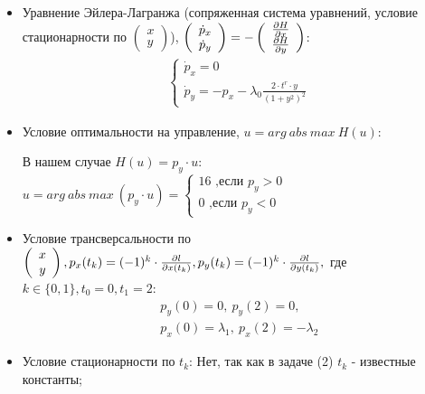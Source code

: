 \documentclass[a4paper,12pt]{article}
\newcommand{\partdef}[2]{\frac{\partial \mathnormal{#1}}{\partial \mathnormal{#2}}}
\begin{document}
\begin{itemize}
    \item[\text{(a)}]

    Уравнение Эйлера-Лагранжа (сопряженная система уравнений, условие стационарности по 
    $
    \left( 
        \begin{array}{c}
            x \\
            y
        \end{array}
    \right)
    $),
    $
    \left( 
        \begin{array}{c}
            \dot p_x \\
            \dot p_y
        \end{array}
    \right)=-
    \left( 
        \begin{array}{c}
            \partdef{H}{x} \\
            \partdef{H}{y}
        \end{array}
    \right)
    $:
    \begin{align}
    \left\{
    \begin{array}{l}
        \dot p_x = 0\\
        \dot p_y = -p_x - \lambda_0 \frac{2\cdot t^r \cdot y}{{(1+y^2)}^2}
    \end{array}
    \right.
    \end{align}

\item[\text{(б)}]
Условие оптимальности на управление, $u=arg \:abs\: max\: H(u)$:

В нашем случае $H(u)=p_y \cdot u$:
$u=arg \:abs\: max\:(p_y \cdot u )
=
\left\{
\begin{array}{l}
16 \text{ ,если } p_y>0 \\
0 \text{ ,если } p_y<0
\end{array}
\right.
$

\item[\text{(в)}]
Условие трансверсальности по 
$
\left(
\begin{array}{c}
    x \\
    y
\end{array}
\right)
,
p_x(t_k)=(-1)^k \cdot \partdef{l}{x(t_k)},
p_y(t_k)=(-1)^k \cdot \partdef{l}{y(t_k)},
$ где $k\in\{0,1\},t_0=0,t_1=2:$
\begin{align}
    p_y(0)=0,\: p_y(2)=0,\\
    p_x(0)=\lambda_1,\: p_x(2)=-\lambda_2
\end{align}

\item[\text{(г)}]
Условие стационарности по $t_k$:\newline
Нет, так как в задаче (2) $t_k$ - известные константы;


\end{itemize}
\end{document}
